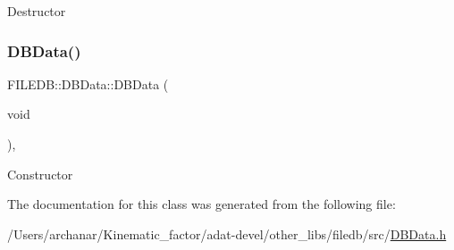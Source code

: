 Destructor \mbox{\label{classFILEDB_1_1DBData_a81662e20dfe472b9c56ec1e9ff8278fc}} 
\subsubsection{\texorpdfstring{DBData()}{DBData()}\hspace{0.1cm}{\footnotesize\ttfamily [3/3]}}
{\footnotesize\ttfamily F\+I\+L\+E\+D\+B\+::\+D\+B\+Data\+::\+D\+B\+Data (\begin{DoxyParamCaption}\item[{void}]{ }\end{DoxyParamCaption})\hspace{0.3cm}{\ttfamily [inline]}, {\ttfamily [protected]}}

Constructor 

The documentation for this class was generated from the following file\+:\begin{DoxyCompactItemize}
\item 
/\+Users/archanar/\+Kinematic\+\_\+factor/adat-\/devel/other\+\_\+libs/filedb/src/\mbox{\hyperlink{adat-devel_2other__libs_2filedb_2src_2DBData_8h}{D\+B\+Data.\+h}}\end{DoxyCompactItemize}
